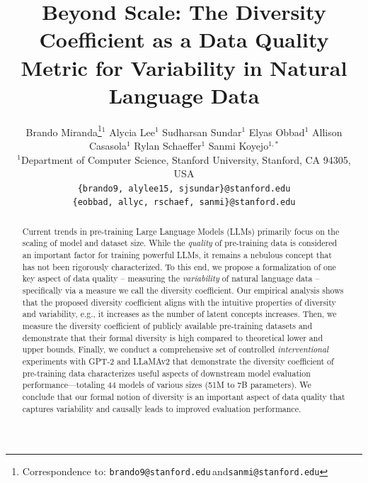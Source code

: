 \documentclass[10pt]{article}
\title{Beyond Scale: The Diversity Coefficient as a Data Quality Metric for Variability in Natural Language Data}
\author{%
Brando Miranda\thanks{Correspondence to: \texttt{brando9@stanford.edu}\,\;and\;\texttt{sanmi@stanford.edu}}\space\space$^{1}$
\And
Alycia Lee$^{1}$
\And
Sudharsan Sundar$^{1}$
\AND
Elyas Obbad$^{1}$
\And
Allison Casasola$^{1}$
\And
Rylan Schaeffer$^{1}$
\AND
Sanmi Koyejo$^{1,*}$
\\[0.8em]
$^{1}$Department of Computer Science, Stanford University, Stanford, CA 94305, USA\\
\texttt{\{brando9, alylee15, sjsundar\}@stanford.edu}\\
\texttt{\{eobbad, allyc, rschaef, sanmi\}@stanford.edu}
}
\begin{document}
\maketitle
\makeatletter\let\AND\@undefined\makeatother

\begin{abstract}
Current trends in pre-training Large Language Models (LLMs) primarily focus on the scaling of model and dataset size.
While the \textit{quality} of pre-training data is considered an important factor for training powerful LLMs, it remains a nebulous concept that has not been rigorously characterized.
To this end, we propose a formalization of one key aspect of data quality -- measuring the \textit{variability} of natural language data -- specifically via a measure we call the diversity coefficient.
Our empirical analysis shows that the proposed diversity coefficient aligns with the intuitive properties of diversity and variability,
e.g., it increases as the number of latent concepts increases.
Then, we measure the diversity coefficient of publicly available pre-training datasets and demonstrate that their formal diversity is high compared to theoretical lower and upper bounds.
Finally, we conduct a comprehensive set of controlled \textit{interventional} experiments with GPT-2 and LLaMAv2 that demonstrate the diversity coefficient of pre-training data characterizes useful aspects of downstream model evaluation performance---totaling 44 models of various sizes (51M to 7B parameters).
We conclude that our formal notion of diversity is an important aspect of data quality that captures variability and causally leads to improved evaluation performance.
\end{abstract}










\end{document}

